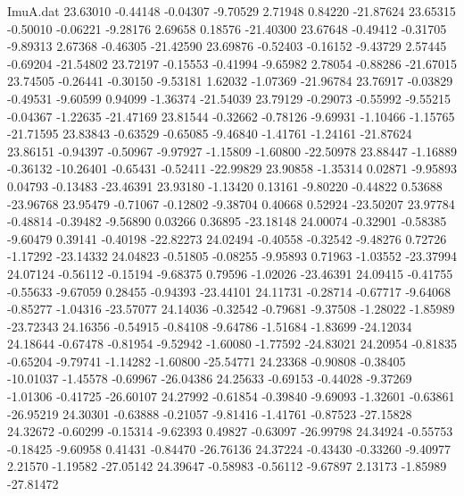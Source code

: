 \begin{filecontents}{ImuA.dat}
  23.63010   -0.44148   -0.04307   -9.70529    2.71948    0.84220  -21.87624
  23.65315   -0.50010   -0.06221   -9.28176    2.69658    0.18576  -21.40300
  23.67648   -0.49412   -0.31705   -9.89313    2.67368   -0.46305  -21.42590
  23.69876   -0.52403   -0.16152   -9.43729    2.57445   -0.69204  -21.54802
  23.72197   -0.15553   -0.41994   -9.65982    2.78054   -0.88286  -21.67015
  23.74505   -0.26441   -0.30150   -9.53181    1.62032   -1.07369  -21.96784
  23.76917   -0.03829   -0.49531   -9.60599    0.94099   -1.36374  -21.54039
  23.79129   -0.29073   -0.55992   -9.55215   -0.04367   -1.22635  -21.47169
  23.81544   -0.32662   -0.78126   -9.69931   -1.10466   -1.15765  -21.71595
  23.83843   -0.63529   -0.65085   -9.46840   -1.41761   -1.24161  -21.87624
  23.86151   -0.94397   -0.50967   -9.97927   -1.15809   -1.60800  -22.50978
  23.88447   -1.16889   -0.36132  -10.26401   -0.65431   -0.52411  -22.99829
  23.90858   -1.35314    0.02871   -9.95893    0.04793   -0.13483  -23.46391
  23.93180   -1.13420    0.13161   -9.80220   -0.44822    0.53688  -23.96768
  23.95479   -0.71067   -0.12802   -9.38704    0.40668    0.52924  -23.50207
  23.97784   -0.48814   -0.39482   -9.56890    0.03266    0.36895  -23.18148
  24.00074   -0.32901   -0.58385   -9.60479    0.39141   -0.40198  -22.82273
  24.02494   -0.40558   -0.32542   -9.48276    0.72726   -1.17292  -23.14332
  24.04823   -0.51805   -0.08255   -9.95893    0.71963   -1.03552  -23.37994
  24.07124   -0.56112   -0.15194   -9.68375    0.79596   -1.02026  -23.46391
  24.09415   -0.41755   -0.55633   -9.67059    0.28455   -0.94393  -23.44101
  24.11731   -0.28714   -0.67717   -9.64068   -0.85277   -1.04316  -23.57077
  24.14036   -0.32542   -0.79681   -9.37508   -1.28022   -1.85989  -23.72343
  24.16356   -0.54915   -0.84108   -9.64786   -1.51684   -1.83699  -24.12034
  24.18644   -0.67478   -0.81954   -9.52942   -1.60080   -1.77592  -24.83021
  24.20954   -0.81835   -0.65204   -9.79741   -1.14282   -1.60800  -25.54771
  24.23368   -0.90808   -0.38405  -10.01037   -1.45578   -0.69967  -26.04386
  24.25633   -0.69153   -0.44028   -9.37269   -1.01306   -0.41725  -26.60107
  24.27992   -0.61854   -0.39840   -9.69093   -1.32601   -0.63861  -26.95219
  24.30301   -0.63888   -0.21057   -9.81416   -1.41761   -0.87523  -27.15828
  24.32672   -0.60299   -0.15314   -9.62393    0.49827   -0.63097  -26.99798
  24.34924   -0.55753   -0.18425   -9.60958    0.41431   -0.84470  -26.76136
  24.37224   -0.43430   -0.33260   -9.40977    2.21570   -1.19582  -27.05142
  24.39647   -0.58983   -0.56112   -9.67897    2.13173   -1.85989  -27.81472

\end{filecontents}
